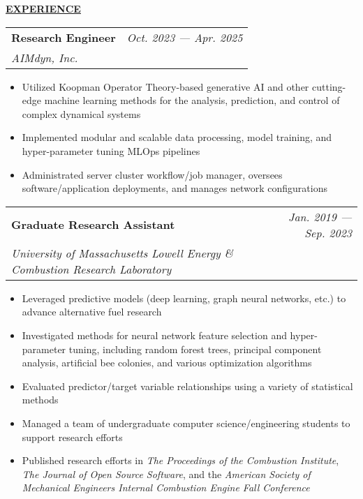 \documentclass{letter}
\begin{document}
    \medskip \large \textbf{\underline{EXPERIENCE}} \medskip \normalsize

    \setlength\tabcolsep{0cm}
    \begin{tabular*}{\linewidth}{L r}
        \textbf{Research Engineer} & \textit{Oct. 2023 --- Apr. 2025} \\
        \textit{AIMdyn, Inc.} & 
    \end{tabular*}

    \small
    \begin{itemize}[leftmargin=0.75cm]
        \setlength{\itemsep}{0pt}
        \item Utilized Koopman Operator Theory-based generative AI and other cutting-edge machine learning methods for the analysis, prediction, and control of complex dynamical systems
        \item Implemented modular and scalable data processing, model training, and hyper-parameter tuning MLOps pipelines
        \item Administrated server cluster workflow/job manager, oversees software/application deployments, and manages network configurations
    \end{itemize}
    \normalsize

    \begin{tabular*}{\linewidth}{L r}
        \textbf{Graduate Research Assistant} & \textit{Jan. 2019 --- Sep. 2023} \\
        \textit{University of Massachusetts Lowell Energy \& Combustion Research Laboratory} & 
    \end{tabular*}

    \small
    \begin{itemize}[leftmargin=0.75cm]
        \setlength{\itemsep}{0pt}
        \item Leveraged predictive models (deep learning, graph neural networks, etc.) to advance alternative fuel research
        \item Investigated methods for neural network feature selection and hyper-parameter tuning, including random forest trees, principal component analysis, artificial bee colonies, and various optimization algorithms
        \item Evaluated predictor/target variable relationships using a variety of statistical methods
        \item Managed a team of undergraduate computer science/engineering students to support research efforts
        \item Published research efforts in \textit{The Proceedings of the Combustion Institute}, \textit{The Journal of Open Source Software}, and the \textit{American Society of Mechanical Engineers Internal Combustion Engine Fall Conference}
    \end{itemize}
    \normalsize
\end{document}
